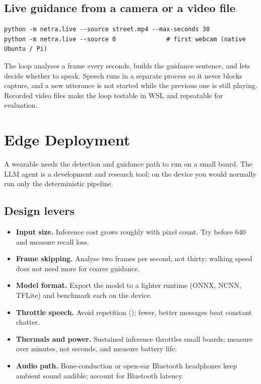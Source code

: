 \section{Live guidance from a camera or a video file}
\begin{lstlisting}[style=sh]
python -m netra.live --source street.mp4 --max-seconds 30
python -m netra.live --source 0              # first webcam (native Ubuntu / Pi)
\end{lstlisting}

The loop analyses a frame every  seconds, builds the guidance sentence, and lets  decide whether to speak. Speech runs in a separate process so it never blocks capture, and a new utterance is not started while the previous one is still playing. Recorded video files make the loop testable in WSL and repeatable for evaluation.

\chapter{Edge Deployment}
A wearable needs the detection and guidance path to run on a small board. The LLM agent is a development and research tool; on the device you would normally run only the deterministic pipeline.

\section{Design levers}
\begin{itemize}
  \item \textbf{Input size.} Inference cost grows roughly with pixel count. Try  before 640 and measure recall loss.
  \item \textbf{Frame skipping.} Analyse two frames per second, not thirty; walking speed does not need more for coarse guidance.
  \item \textbf{Model format.} Export the model to a lighter runtime (ONNX, NCNN, TFLite) and benchmark each on the device.
  \item \textbf{Throttle speech.} Avoid repetition (); fewer, better messages beat constant chatter.
  \item \textbf{Thermals and power.} Sustained inference throttles small boards; measure over minutes, not seconds, and measure battery life.
  \item \textbf{Audio path.} Bone-conduction or open-ear Bluetooth headphones keep ambient sound audible; account for Bluetooth latency.
\end{itemize}

